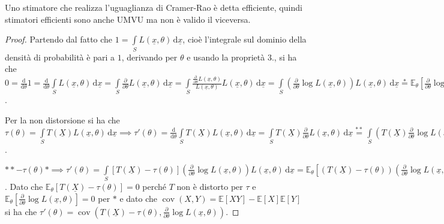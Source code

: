 \documentclass[hidelinks, 10pt]{report}
\DeclareMathOperator{\cov}{cov}
\begin{document}
\begin{defn}
Uno stimatore che realizza l'uguaglianza di Cramer-Rao \`e detta efficiente, quindi stimatori efficienti sono anche UMVU ma non \`e valido il viceversa.
\end{defn}

\begin{proof}
Partendo dal fatto che $ 1 = \int\limits_{S} L(\underline{x}, \theta) \, \mathrm{d}\underline{x} $, cio\`e l'integrale sul dominio della densit\`a di probabilit\`a \`e pari a $ 1 $, derivando per $ \theta $ e usando la propriet\`a 3., si ha che $ 0 = \frac{\mathrm{d}}{\mathrm{d} \theta} 1 = \frac{\mathrm{d}}{\mathrm{d} \theta} \int\limits_{S} L(\underline{x}, \theta) \, \mathrm{d}\underline{x} = \int\limits_{S} \frac{\partial}{\partial \theta} L(\underline{x}, \theta) \, \mathrm{d}\underline{x} = \int\limits_{S} \frac{\frac{\partial}{\partial \theta} L(\underline{x}, \theta)}{L(\underline{x}, \theta)} L(\underline{x}, \theta) \, \mathrm{d}\underline{x} = \int\limits_{S} \left( \frac{\partial}{\partial \theta} \log L(\underline{x}, \theta) \right) L(\underline{x}, \theta) \, \mathrm{d}\underline{x} \stackrel{\ast}{=} \mathbb{E}_{\theta} \left[ \frac{\partial}{\partial \theta} \log L(\underline{X}, \theta) \right] $.

Per la non distorsione si ha che $ \tau(\theta) = \int\limits_{S} T(\underline{X}) L(\underline{x}, \theta) \, \mathrm{d}\underline{x} \implies \tau'(\theta) = \frac{\mathrm{d}}{\mathrm{d} \theta} \int\limits_{S} T(\underline{X}) L(\underline{x}, \theta) \, \mathrm{d}\underline{x} = \int\limits_{S} T(\underline{X}) \frac{\partial}{\partial \theta} L(\underline{x}, \theta) \, \mathrm{d}\underline{x} \stackrel{\ast \ast}{=} \int\limits_{S} \left( T(\underline{X}) \frac{\partial}{\partial \theta} \log L(\underline{x}, \theta) \right) L(\underline{x}, \theta) \, \mathrm{d}\underline{x} $.

$ \ast\ast - \tau(\theta) \ast \implies \tau'(\theta) = \int\limits_{S} \left[ T(\underline{X}) - \tau(\theta) \right] \left( \frac{\partial}{\partial \theta} \log L(\underline{x}, \theta) \right) L(\underline{x}, \theta) \, \mathrm{d}\underline{x} = \mathbb{E}_{\theta} \left[ \left( T(\underline{X}) - \tau(\theta) \right) \left( \frac{\partial}{\partial \theta} \log L(\underline{x}, \theta) \right) \right] $. Dato che $ \mathbb{E}_{\theta} \left[ T(\underline{X}) - \tau(\theta) \right] = 0 $ perch\'e $ T $ non \`e distorto per $ \tau $ e $ \mathbb{E}_{\theta} \left[ \frac{\partial}{\partial \theta} \log L(\underline{x}, \theta) \right] = 0 $ per $ \ast $ e dato che $ \cov(X, Y) = \mathbb{E} [XY] - \mathbb{E} [X] \mathbb{E}[Y] $ si ha che $ \tau'(\theta) = \cov \left( T(\underline{X}) - \tau(\theta), \frac{\partial}{\partial \theta} \log L(\underline{x}, \theta) \right) $.


\end{proof}
\end{document}

